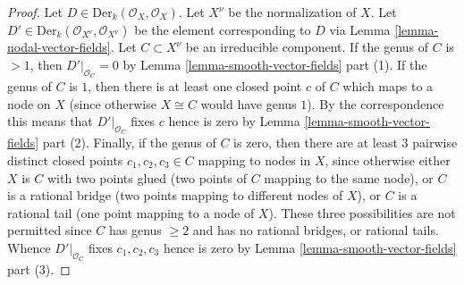 \documentclass{stacks-project}
\theoremstyle{plain}
\theoremstyle{definition}
\theoremstyle{remark}
\numberwithin{equation}{subsection}
\begin{document}
\begin{proof}
Let $D \in \text{Der}_k(\mathcal{O}_X, \mathcal{O}_X)$.
Let $X^\nu$ be the normalization of $X$.
Let $D' \in \text{Der}_k(\mathcal{O}_{X^\nu}, \mathcal{O}_{X^\nu})$
be the element corresponding to $D$ via Lemma \ref{lemma-nodal-vector-fields}.
Let $C \subset X^\nu$ be an irreducible component.
If the genus of $C$ is $> 1$, then $D'|_{\mathcal{O}_C} = 0$
by Lemma \ref{lemma-smooth-vector-fields} part (1).
If the genus of $C$ is $1$, then there is at least one closed point $c$ of $C$
which maps to a node on $X$ (since otherwise $X \cong C$ would have genus $1$).
By the correspondence this means that
$D'|_{\mathcal{O}_C}$ fixes $c$ hence is zero by
Lemma \ref{lemma-smooth-vector-fields} part (2).
Finally, if the genus of $C$ is zero, then there are at least
$3$ pairwise distinct closed points $c_1, c_2, c_3 \in C$
mapping to nodes in $X$, since otherwise either
$X$ is $C$ with two points glued (two points of $C$ mapping
to the same node), or
$C$ is a rational bridge (two points mapping to different nodes of $X$), or
$C$ is a rational tail (one point mapping to a node of $X$).
These three possibilities are not permitted since
$C$ has genus $\geq 2$ and has no rational bridges, or rational tails.
Whence $D'|_{\mathcal{O}_C}$ fixes $c_1, c_2, c_3$ hence is zero by
Lemma \ref{lemma-smooth-vector-fields} part (3).
\end{proof}









\end{document}
